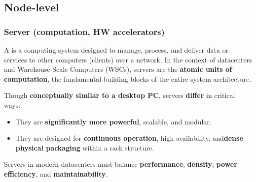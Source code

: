 \subsection{Node-level}

\subsubsection{Server (computation, HW accelerators)}\label{subsubsection: Server (computation, HW accelerators)}

A  is a computing system designed to manage, process, and deliver data or services to other computers (clients) over a network. In the context of datacenters and Warehouse-Scale Computers (WSCs), servers are the \textbf{atomic units of computation}, the fundamental building blocks of the entire system architecture.

\highspace
Though \textbf{conceptually similar to a desktop PC}, servers \textbf{differ} in critical ways:
\begin{itemize}
    \item They are \textbf{significantly more powerful}, scalable, and modular.
    \item They are designed for \textbf{continuous operation}, high availability, and\break \textbf{dense physical packaging} within a rack structure.
\end{itemize}
Servers in modern datacenters must balance \textbf{performance}, \textbf{density}, \textbf{power efficiency}, and \textbf{maintainability}.

